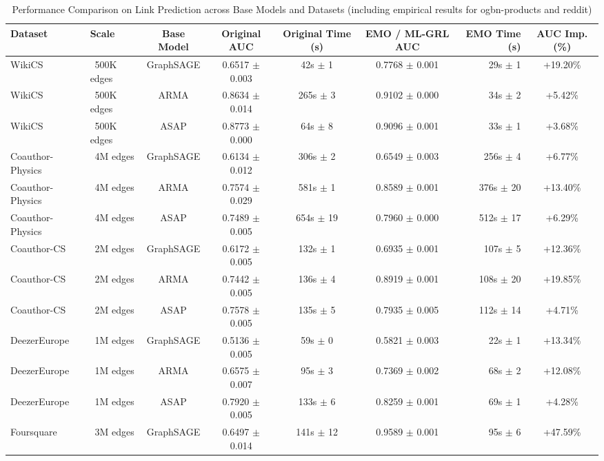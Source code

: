 \begin{table}[!t]
\renewcommand{\arraystretch}{1.2}
\caption{Performance Comparison on Link Prediction across Base Models and Datasets (including empirical results for ogbn-products and reddit)}
\label{table_lp_main}
\centering
\begin{tabular}{llccccrc}
\toprule
\textbf{Dataset} & \textbf{Scale} & \textbf{Base Model} & \textbf{Original AUC} & \textbf{Original Time (s)} & \textbf{EMO / ML-GRL AUC} & \textbf{EMO Time (s)} & \textbf{AUC Imp. (\%)} \\
\midrule
WikiCS & ~500K edges & GraphSAGE & 0.6517 $\pm$ 0.003 & 42s $\pm$ 1 & 0.7768 $\pm$ 0.001 & 29s $\pm$ 1 & +19.20\% \\
WikiCS & ~500K edges & ARMA & 0.8634 $\pm$ 0.014 & 265s $\pm$ 3 & 0.9102 $\pm$ 0.000 & 34s $\pm$ 2 & +5.42\% \\
WikiCS & ~500K edges & ASAP & 0.8773 $\pm$ 0.000 & 64s $\pm$ 8 & 0.9096 $\pm$ 0.001 & 33s $\pm$ 1 & +3.68\% \\
\midrule
Coauthor-Physics & ~4M edges & GraphSAGE & 0.6134 $\pm$ 0.012 & 306s $\pm$ 2 & 0.6549 $\pm$ 0.003 & 256s $\pm$ 4 & +6.77\% \\
Coauthor-Physics & ~4M edges & ARMA & 0.7574 $\pm$ 0.029 & 581s $\pm$ 1 & 0.8589 $\pm$ 0.001 & 376s $\pm$ 20 & +13.40\% \\
Coauthor-Physics & ~4M edges & ASAP & 0.7489 $\pm$ 0.005 & 654s $\pm$ 19 & 0.7960 $\pm$ 0.000 & 512s $\pm$ 17 & +6.29\% \\
\midrule
Coauthor-CS & ~2M edges & GraphSAGE & 0.6172 $\pm$ 0.005 & 132s $\pm$ 1 & 0.6935 $\pm$ 0.001 & 107s $\pm$ 5 & +12.36\% \\
Coauthor-CS & ~2M edges & ARMA & 0.7442 $\pm$ 0.005 & 136s $\pm$ 4 & 0.8919 $\pm$ 0.001 & 108s $\pm$ 20 & +19.85\% \\
Coauthor-CS & ~2M edges & ASAP & 0.7578 $\pm$ 0.005 & 135s $\pm$ 5 & 0.7935 $\pm$ 0.005 & 112s $\pm$ 14 & +4.71\% \\
\midrule
DeezerEurope & ~1M edges & GraphSAGE & 0.5136 $\pm$ 0.005 & 59s $\pm$ 0 & 0.5821 $\pm$ 0.003 & 22s $\pm$ 1 & +13.34\% \\
DeezerEurope & ~1M edges & ARMA & 0.6575 $\pm$ 0.007 & 95s $\pm$ 3 & 0.7369 $\pm$ 0.002 & 68s $\pm$ 2 & +12.08\% \\
DeezerEurope & ~1M edges & ASAP & 0.7920 $\pm$ 0.005 & 133s $\pm$ 6 & 0.8259 $\pm$ 0.001 & 69s $\pm$ 1 & +4.28\% \\
\midrule
Foursquare & ~3M edges & GraphSAGE & 0.6497 $\pm$ 0.014 & 141s $\pm$ 12 & 0.9589 $\pm$ 0.001 & 95s $\pm$ 6 & +47.59\% \\

\end{tabular}
\end{table}
